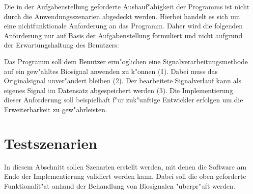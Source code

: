 Die in der Aufgabenstellung geforderte Ausbauf"ahigkeit der Programms ist nicht durch die Anwendungsszenarien abgedeckt werden.
Hierbei handelt es sich um eine nichtfunktionale Anforderung an das Programm.
Daher wird die folgenden Anforderung nur auf Basis der Aufgabenstellung formuliert und nicht aufgrund der Erwartungshaltung des Benutzers:
\begin{enumerate}[resume]
	 Das Programm soll dem Benutzer erm"oglichen eine Signalverarbeitungsmethode auf ein gew"ahltes Biosignal anwenden zu k"onnen (1).
							Dabei muss das Originalsignal unver"andert bleiben (2).
							Der bearbeitete Signalverlauf kann als eigenes Signal im Datensatz abgespeichert werden (3).
							Die Implementierung dieser Anforderung soll beispielhaft f"ur zuk"unftige Entwickler erfolgen um die Erweiterbarkeit zu gew"ahrleisten.
\end{enumerate}

\section{Testszenarien}
\label{sec:testszenarien}

In diesem Abschnitt sollen Szenarien erstellt werden, mit denen die Software am Ende der Implementierung validiert werden kann.
Dabei soll die oben geforderte Funktionalit"at anhand der Behandlung von Biosignalen "uberpr"uft werden.

